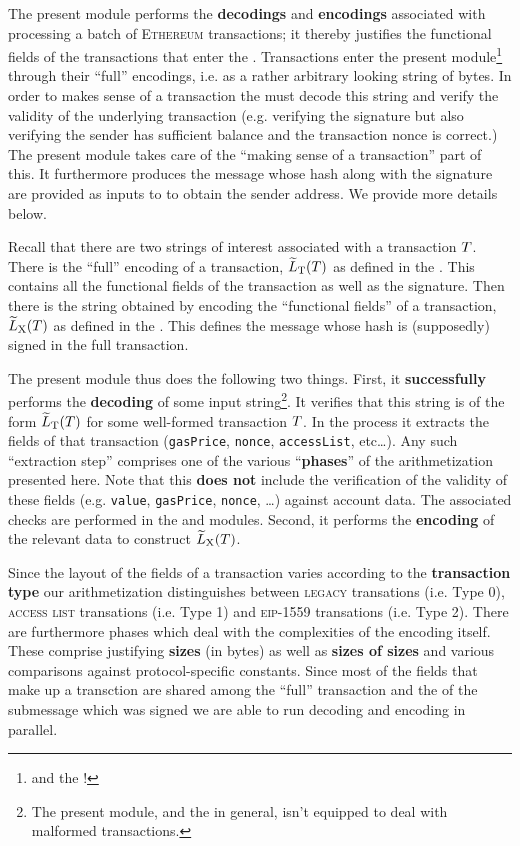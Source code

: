The present module performs the \rlp{} \textbf{decodings} and \textbf{encodings} associated with processing a batch of \textsc{Ethereum} transactions; it thereby justifies the functional fields of the transactions that enter the \zkEvm{}.
Transactions enter the present module\footnote{and the \zkEvm{}!} through their ``full'' \rlp{} encodings, i.e. as a rather arbitrary looking string of bytes.
In order to makes sense of a transaction the \zkEvm{} must decode this string and verify the validity of the underlying transaction (e.g. verifying the signature but also verifying the sender has sufficient balance and the transaction nonce is correct.)
The present module takes care of the ``making sense of a transaction'' part of this.
It furthermore produces the message whose hash along with the signature are provided as inputs to  to obtain the sender address.
We provide more details below.

Recall that there are two \rlp{} strings of interest associated with a transaction $T$.
There is the ``full'' \rlp{} encoding of a transaction, $\widetilde{L}_{\mathrm{T}}(T)$ as defined in the \cite{EYP}.
This contains all the functional fields of the transaction as well as the signature.
Then there is the \rlp{} string obtained by \rlp{} encoding the ``functional fields'' of a transaction, $\widetilde{L}_{\mathrm{X}}(T)$ as defined in the \cite{EYP}.
This defines the message whose hash is (supposedly) signed in the full transaction.

The present module thus does the following two things.
First, it \textbf{successfully} performs the \rlp{} \textbf{decoding} of some input string\footnote{The present module, and the \zkEvm{} in general, isn't equipped to deal with malformed transactions.}.
It verifies that this string is of the form $\widetilde{L}_{\mathrm{T}}(T)$ for some well-formed transaction $T$.
In the process it extracts the fields of that transaction (\texttt{gasPrice}, \texttt{nonce}, \texttt{accessList}, etc\dots{}).
Any such ``extraction step'' comprises one of the various ``\textbf{phases}'' of the arithmetization presented here.
Note that this \textbf{does not} include the verification of the validity of these fields (e.g. \texttt{value}, \texttt{gasPrice}, \texttt{nonce}, \dots) against account data.
The associated checks are performed in the \txnDataMod{} and \hubMod{} modules.
Second, it performs the \rlp{} \textbf{encoding} of the relevant data to construct $\widetilde{L}_{\mathrm{X}}(T)$.

Since the layout of the fields of a transaction varies according to the \textbf{transaction type} our arithmetization distinguishes between
\textsc{legacy} transations (i.e. Type 0),
\textsc{access list} transations (i.e. Type 1) and
\textsc{eip-1559} transations (i.e. Type 2).
There are furthermore phases which deal with the complexities of the \rlp{} encoding itself.
These comprise justifying \textbf{sizes} (in bytes) as well as \textbf{sizes of sizes} and various comparisons against protocol-specific constants.
Since most of the fields that make up a transction are shared among the ``full'' transaction \rlp{} and the \rlp{} of the submessage which was signed we are able to run decoding and encoding in parallel.


